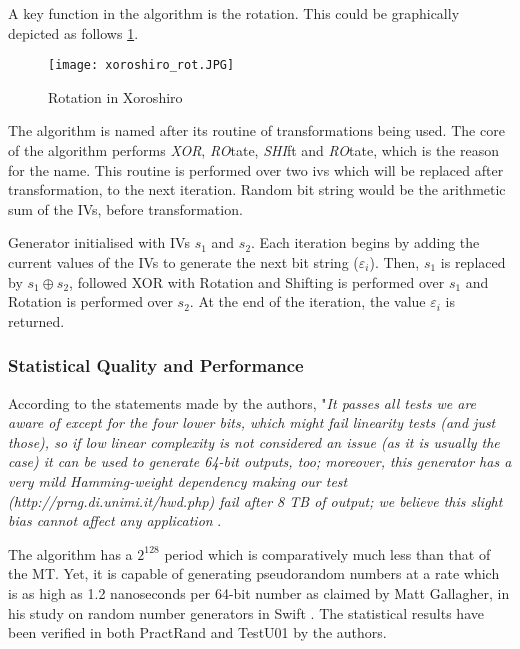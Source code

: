 A key function in the algorithm is the rotation. This could be graphically depicted as follows \ref{fig:xoroshiro_rot}.

\begin{figure}[h!]
    \texttt{[image: xoroshiro\_rot.JPG]}
    \centering
    \caption{Rotation in Xoroshiro}
    \label{fig:xoroshiro_rot}
\end{figure}

The algorithm is named after its routine of transformations being used. The core of the algorithm performs  \textit{XOR}, \textit{RO}tate, \textit{SHI}ft and \textit{RO}tate, which is the reason for the name. This routine is performed over two \acrfull{iv}s which will be replaced after transformation, to the next iteration. Random bit string would be the arithmetic sum of the IVs, before transformation.

Generator initialised with IVs $s_1$ and $s_2$. Each iteration begins by adding the current values of the IVs to generate the next bit string ($\varepsilon_i$). Then, $s_1$ is replaced by $s_1 \oplus s_2$, followed XOR with Rotation and Shifting is performed over $s_1$ and Rotation is performed over $s_2$. At the end of the iteration, the value $\varepsilon_i$ is returned.

\subsubsection{Statistical Quality and Performance}

According to the statements made by the authors, "\textit{It passes all tests we are aware of except for the four lower bits, which might fail linearity tests (and just those), so if low linear complexity is not considered an issue (as it is usually the case) it can be used to generate 64-bit outputs, too; moreover, this generator has a very mild Hamming-weight dependency making our test (http://prng.di.unimi.it/hwd.php) fail after 8 TB of output; we believe this slight bias cannot affect any application} \cite{web_xoroshiro_impl}.

The algorithm has a $2^{128}$ period which is comparatively much less than that of the MT. Yet, it is capable of generating pseudorandom numbers at a rate which is as high as 1.2 nanoseconds per 64-bit number as claimed by Matt Gallagher, in his study on random number generators in Swift \cite{web_xoroshiro_mg_swift}. The statistical results have been verified in both PractRand and TestU01 by the authors. 

